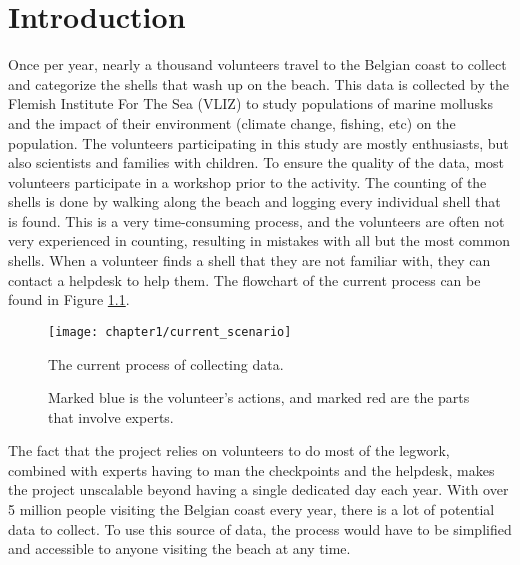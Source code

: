 
\chapter{Introduction}

Once per year, nearly a thousand volunteers travel to the Belgian coast to collect and categorize the shells that wash up on the beach. This data is collected by the Flemish Institute For The Sea (VLIZ) to study populations of marine mollusks and the impact of their environment (climate change, fishing, etc) on the population. The volunteers participating in this study are mostly enthusiasts, but also scientists and families with children. To ensure the quality of the data, most volunteers participate in a workshop prior to the activity. The counting of the shells is done by walking along the beach and logging every individual shell that is found. This is a very time-consuming process, and the volunteers are often not very experienced in counting, resulting in mistakes with all but the most common shells. When a volunteer finds a shell that they are not familiar with, they can contact a helpdesk to help them. The flowchart of the current process can be found in Figure \ref{fig:1_current_scenario}. 

\begin{figure}[h]
	\centering
	\texttt{[image: chapter1/current\_scenario]}
	\captionsetup{belowskip=-\baselineskip}
	\caption{The current process of collecting data.}
	\label{fig:1_current_scenario}
	\setlength\belowcaptionskip{\baselineskip}
	\caption*{Marked blue is the volunteer's actions, and marked red are the parts that involve experts.}
\end{figure}

The fact that the project relies on volunteers to do most of the legwork, combined with experts having to man the checkpoints and the helpdesk, makes the project unscalable beyond having a single dedicated day each year. With over 5 million people
visiting the Belgian coast every year\cite{Kustportaal}, there is a lot of potential data to collect. To use this source of data, the process would have to be simplified and accessible to anyone visiting the beach at any time.

